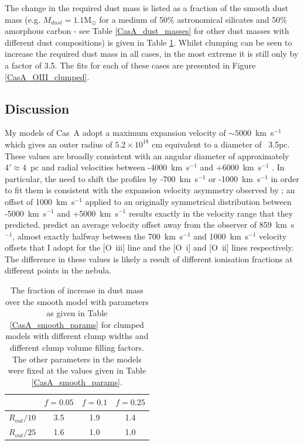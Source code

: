 The change in the required dust mass is listed as a fraction of the smooth dust mass (e.g. $M_{dust}=1.1$M$_{\odot}$ for a medium of 50\% astronomical silicates and 50\% amorphous carbon - see Table \ref{CasA_dust_masses} for other dust masses with different dust compositions) is given in Table \ref{CasA_clumped_dust_masses}.  Whilst clumping can be seen to increase the required dust mass in all cases, in the most extreme it is still only by a factor of 3.5.  The fits for each of these cases are presented in Figure \ref{CasA_OIII_clumped}.

\subsection{Discussion}

My models of Cas~A adopt a maximum expansion velocity of $\sim5000$~km~s$^{-1}$ which gives an outer radius of  $5.2\times10^{18}$ cm equivalent to a diameter of ~3.5pc.   These values are broadly consistent with an angular diameter of approximately $4'\approx4$~pc \citep{Hurford1996} and radial velocities between -4000~km~s$^{-1}$ and +6000~km~s$^{-1}$ \citep{DeLaney2010}.  In particular, the need to shift the profiles by -700~km~s$^{-1}$ or -1000~km~s$^{-1}$ in order to fit them is consistent with the expansion velocity asymmetry observed by \citet{DeLaney2010}; an offset of 1000~km~s$^{-1}$ applied to an originally symmetrical distribution between -5000~km~s$^{-1}$ and +5000~km~s$^{-1}$ results exactly in the velocity range that they predicted.  \citet{DeLaney2010} predict an average velocity offset away from the observer of 859~km~s$^{-1}$, almost exactly halfway between the 700~km~s$^{-1}$ and 1000~km~s$^{-1}$  velocity offsets that I adopt for the [O~{\sc iii}] line and the [O~{\sc i}] and [O~{\sc ii}] lines respectively.  The difference in these values is likely a result of different ionisation fractions at different points in the nebula.

\begin{table}
\caption{The fraction of increase in dust mass over the smooth model with parameters as given in Table \ref{CasA_smooth_params} for clumped models with different clump widths and different clump volume filling factors.  The other parameters in the models were fixed at the values given in Table \ref{CasA_smooth_params}.}
\centering
\begin{tabular}{l  c c c}
\hline
& $f=0.05$ &$f=0.1$&$f=0.25$\\
\hline
$R_{out}/10$ & 3.5 & 1.9 & 1.4 \\
$R_{out}/25$ & 1.6 & 1.0 & 1.0 \\
\hline
\end{tabular}
\label{CasA_clumped_dust_masses}
\end{table}

